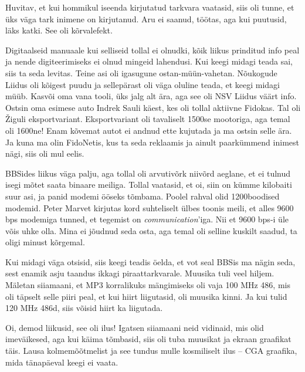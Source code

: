 Huvitav, et kui hommikul iseenda kirjutatud 
tarkvara vaatasid, siis oli tunne, et üks väga tark inimene on kirjutanud. Aru ei 
saanud, töötas, aga kui puutusid, läks katki. See oli kõrvalefekt. 


Digitaalseid manuaale kui selliseid tollal ei olnudki, kõik liikus prinditud info peal 
ja nende digiteerimiseks ei olnud mingeid lahendusi. Kui keegi midagi teada sai, siis ta seda levitas. Teine asi oli igasugune 
ostan-müün-vahetan. Nõukogude Liidus oli kõigest puudu ja sellepärast oli väga oluline 
teada, et keegi midagi müüb. Kasvõi oma vana tooli, üks jalg 
alt ära, aga see oli NSV Liidus väärt info. Ostsin oma 
esimese auto Indrek Sauli käest, kes oli tollal 
aktiivne Fidokas. Tal oli Žiguli eksportvariant. Eksportvariant oli tavaliselt 
1500se mootoriga, aga temal oli 1600ne! Enam kõvemat autot ei andnud 
ette kujutada ja ma ostsin selle ära. Ja kuna ma olin FidoNetis, kus ta seda reklaamis 
ja ainult paarkümmend inimest nägi, siis oli mul eelis.


BBSides liikus väga palju, aga tollal oli arvutivõrk niivõrd aeglane, et ei
tulnud isegi mõtet saata binaare meiliga. Tollal vaatasid, et 
oi, siin on kümme kilobaiti suur asi, ja panid modemi ööseks tõmbama. 
Poolel rahval olid 1200boodised 
modemid. Peter Marvet kirjutas kord suhteliselt ülbes 
toonis meili, et alles 9600 bps modemiga tunned, et tegemist on 
\emph{communication}'iga. Nii et 9600 bps-i üle võis uhke 
olla. Mina ei jõudnud seda osta, aga temal oli selline kuskilt 
saadud, ta oligi minust kõrgemal. 

Kui midagi väga otsisid, siis keegi teadis öelda, et 
vot seal BBSis ma nägin seda, sest enamik asju taandus ikkagi 
piraattarkvarale. Muusika tuli veel hiljem. Mäletan siiamaani, 
et MP3 korralikuks mängimiseks oli vaja 100 MHz 486, mis oli täpselt selle 
piiri peal, et kui hiirt liigutasid, oli muusika kinni. Ja kui tulid 120 MHz 
486d, siis võisid hiirt ka liigutada.


Oi, demod liikusid, see oli ilus! Igatsen siiamaani neid vidinaid, mis olid 
imeväikesed, aga kui käima tõmbasid, siis oli tuba muusikat ja ekraan 
graafikat täis. Lausa kolmemõõtmelist ja see tundus mulle 
kosmiliselt ilus -- CGA graafika, mida 
tänapäeval keegi ei vaata. 

